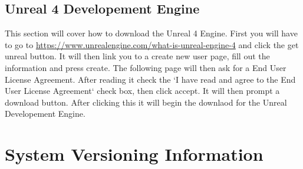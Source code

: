 \subsection{Unreal 4 Developement Engine}
This section will cover how to download the Unreal 4 Engine. First you will have to go to \url{https://www.unrealengine.com/what-is-unreal-engine-4} and click the get unreal button. It will then link you to  a create new user page, fill out the information and press create. The following page will then ask for a End User License Agreement. After reading it check the `I have read and agree to the End User License Agreement` check box, then click accept. It will then prompt a download button. After clicking this it will begin the downlaod for the Unreal Developement Engine.


\section{System  Versioning Information}

